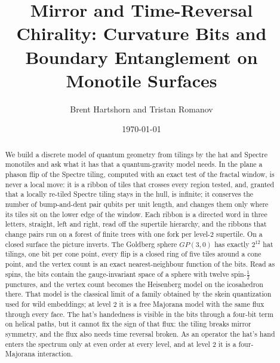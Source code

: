 \documentclass[11pt]{article}
\title{Mirror and Time-Reversal Chirality: Curvature Bits and Boundary Entanglement on Monotile Surfaces}
\author{Brent Hartshorn \orcidlink{0009-0004-2853-655X} and Tristan Romanov}
\date{\today}
\theoremstyle{definition}
\begin{document}
\maketitle

\begin{abstract}
\noindent We build a discrete model of quantum geometry from tilings by the hat and Spectre monotiles and ask what it has that a quantum-gravity model needs. In the plane a phason flip of the Spectre tiling, computed with an exact test of the fractal window, is never a local move: it is a ribbon of tiles that crosses every region tested, and, granted that a locally re-tiled Spectre tiling stays in the hull, is infinite; it conserves the number of bump-and-dent pair qubits per unit length, and changes them only where its tiles sit on the lower edge of the window. Each ribbon is a directed word in three letters, straight, left and right, read off the supertile hierarchy, and the ribbons that change pairs run on a forest of finite trees with one fork per level-$2$ supertile. On a closed surface the picture inverts. The Goldberg sphere $GP(3,0)$ has exactly $2^{12}$ hat tilings, one bit per cone point, every flip is a closed ring of five tiles around a cone point, and the vertex count is an exact nearest-neighbour function of the bits. Read as spins, the bits contain the gauge-invariant space of a sphere with twelve spin-$\tfrac12$ punctures, and the vertex count becomes the Heisenberg model on the icosahedron there. That model is the classical limit of a family obtained by the skein quantization used for wild embeddings; at level $2$ it is a free Majorana model with the same flux through every face. The hat's handedness is visible in the bits through a four-bit term on helical paths, but it cannot fix the sign of that flux: the tiling breaks mirror symmetry, and the flux also needs time reversal broken. As an operator the hat's hand enters the spectrum only at even order at every level, and at level $2$ it is a four-Majorana interaction.
\end{abstract}

\end{document}
